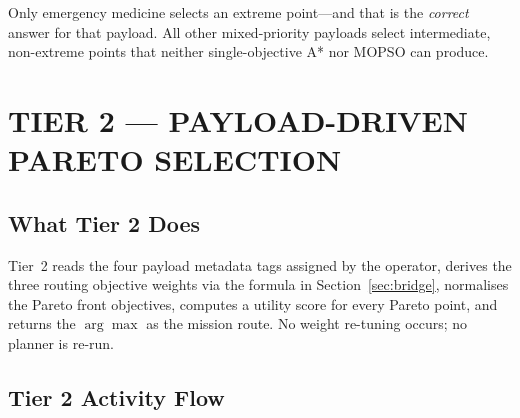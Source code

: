 \begin{table}[ht!]
\centering
\caption{Payload Presets and Expected Pareto Point Selection}
\label{tab:presets}
\renewcommand{\arraystretch}{1.3}
\end{table}

Only emergency medicine selects an extreme point---and that is the \textit{correct}
answer for that payload. All other mixed-priority payloads select intermediate,
non-extreme points that neither single-objective A* nor MOPSO can produce.

\section{TIER 2 --- PAYLOAD-DRIVEN PARETO SELECTION}
\label{sec:tier2}

\subsection{What Tier 2 Does}

Tier~2 reads the four payload metadata tags assigned by the operator, derives the three
routing objective weights via the formula in Section~\ref{sec:bridge}, normalises the
Pareto front objectives, computes a utility score for every Pareto point, and returns
the $\arg\max$ as the mission route. No weight re-tuning occurs; no planner is re-run.

\subsection{Tier 2 Activity Flow}

